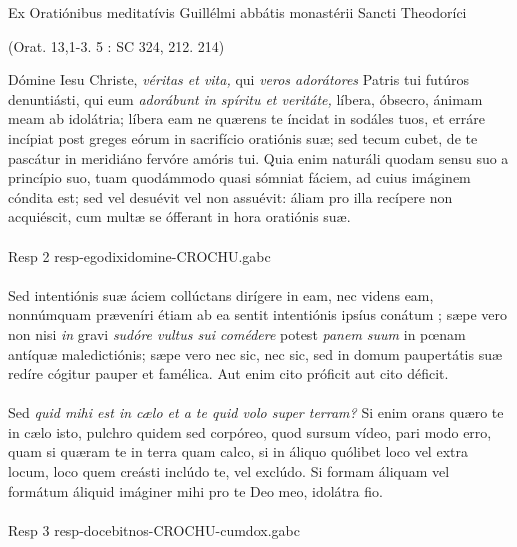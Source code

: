 \documentclass[options]{article}
\begin{document}
	Ex Oratiónibus meditatívis Guillélmi abbátis monastérii Sancti Theodoríci
	\begin{flushright}
		(Orat. 13,1-3. 5 : SC 324, 212. 214)
	\end{flushright}
Dómine Iesu Christe,
\emph{véritas et vita,} qui \emph{veros adorátores}
Patris tui futúros denuntiásti, qui eum
\emph{adorábunt in spíritu et veritáte,}
líbera, óbsecro, ánimam meam ab idolátria; líbera eam ne quærens te íncidat in sodáles tuos, et erráre incípiat post greges eórum in sacrifício oratiónis suæ; sed tecum cubet, de te pascátur in meridiáno fervóre amóris tui. Quia enim naturáli quodam sensu suo a princípio suo, tuam quodámmodo quasi sómniat fáciem, ad cuius imáginem cóndita est; sed vel desuévit vel non assuévit: áliam pro illa recípere non acquiéscit, cum multæ se ófferant in hora oratiónis suæ.\\
\\
Resp 2 resp-egodixidomine-CROCHU.gabc\\
\\
Sed intentiónis suæ áciem collúctans dirígere in eam, nec videns eam, nonnúmquam præveníri étiam ab ea sentit intentiónis ipsíus conátum ; sæpe vero non nisi \emph{in} gravi \emph{sudóre vultus sui comédere} potest \emph{panem suum} in pœnam antíquæ maledictiónis; sæpe vero nec sic, nec sic, sed in domum paupertátis suæ redíre cógitur pauper et famélica. Aut enim cito próficit aut cito déficit.\\
\\
Sed \emph{quid mihi est in cælo et a te quid volo super terram?} Si enim orans quæro te in cælo isto, pulchro quidem sed corpóreo, quod sursum vídeo, pari modo erro, quam si quæram te in terra quam calco, si in áliquo quólibet loco vel extra locum, loco quem creásti inclúdo te, vel exclúdo. Si formam áliquam vel formátum áliquid imáginer mihi pro te Deo meo, idolátra fio. \\
\\
Resp 3 resp-docebitnos-CROCHU-cumdox.gabc
\end{document}
